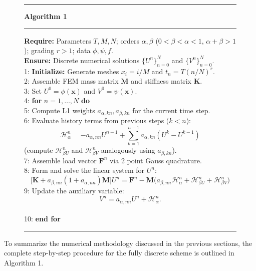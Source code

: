 \documentclass{amsart}
\numberwithin{equation}{section}
\begin{document}
\begin{figure}[ht]
\hrule \vspace{4pt}
\noindent \textbf{Algorithm 1} 
\vspace{4pt} \hrule \vspace{6pt}
\begin{minipage}{\textwidth}
\noindent \textbf{Require:} Parameters $T, M, N$; orders $\alpha, \beta$ ($0<\beta< \alpha<1$, $\alpha+\beta>1$); grading $r>1$; data $\phi, \psi, f$. \\
\textbf{Ensure:} Discrete numerical solutions $\{U^n\}_{n=0}^N$ and $\{V^n\}_{n=0}^N$. \\[4pt]
1: \textbf{Initialize:} Generate meshes $x_i = i/M$ and $t_n = T(n/N)^r$. \\
2: Assemble FEM mass matrix $\mathbf{M}$ and stiffness matrix $\mathbf{K}$. \\
3: Set $U^0 = \phi(\mathbf{x})$ and $V^0 = \psi(\mathbf{x})$. \\
4: \textbf{for} $n=1, \dots, N$ \textbf{do} \\
5:  Compute L1 weights $a_{\alpha,kn}, a_{\beta,kn}$ for the current time step. \\
6:  Evaluate history  terms from previous steps ($k < n$):
$$    \mathcal{H}_\alpha^n = -a_{\alpha,nn} U^{n-1} + \sum_{k=1}^{n-1} a_{\alpha,kn} (U^k - U^{k-1})$$
\hspace*{1.5em} (compute $\mathcal{H}_{\beta U}^n$ and $\mathcal{H}_{\beta V}^n$ analogously using $a_{\beta,kn}$). \\
7:  Assemble load vector $\mathbf{F}^n$ via 2 point Gauss quadrature. \\
8:  Form and solve the linear system for $U^n$:
\begin{equation*}
    \bigl[ \mathbf{K} + a_{\beta,nn}(1+a_{\alpha,nn})\mathbf{M} \bigr] U^n = \mathbf{F}^n - \mathbf{M}\bigl(a_{\beta,nn} \mathcal{H}_\alpha^n + \mathcal{H}_{\beta U}^n + \mathcal{H}_{\beta V}^n\bigr)
\end{equation*}
9: Update the auxiliary variable: $$V^n = a_{\alpha,nn} U^n + \mathcal{H}_\alpha^n.$$ \\
10: \textbf{end for}
\end{minipage}
\vspace{6pt} \hrule 
\end{figure}

To summarize the numerical methodology discussed in the previous sections, the complete step-by-step procedure for the fully discrete scheme is outlined in Algorithm 1.
\end{document}
